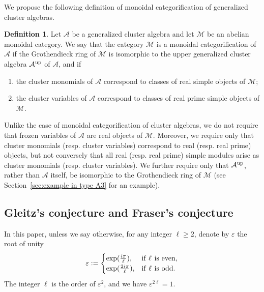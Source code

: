 \documentclass[11pt, reqno]{amsart}
\theoremstyle{plain}
\theoremstyle{definition}
\newtheorem{definition}[theorem]{Definition}
\numberwithin{equation}{section}
\begin{document}
We propose the following definition of monoidal categorification of generalized cluster algebras. 
\begin{definition}
Let $\mathcal{A}$ be a generalized cluster algebra and let $\mathcal{M}$ be an abelian monoidal category. We say that the category $\mathcal{M}$ is a monoidal categorification of $\mathcal{A}$ if the Grothendieck ring of $\mathcal{M}$ is isomorphic to the upper generalized cluster algebra $\mathcal{A}^{\rm up}$ of $\mathcal{A}$, and if 
\begin{enumerate}
\item the cluster monomials of $\mathcal{A}$ correspond to classes of real simple objects of $\mathcal{M}$;
\item the cluster variables of $\mathcal{A}$ correspond to classes of real prime simple objects of $\mathcal{M}$. 
\end{enumerate} 
\end{definition}

Unlike the case of monoidal categorification of cluster algebras, we do not require that frozen variables of $\mathcal{A}$ are real objects of $\mathcal{M}$. Moreover, we require only that cluster monomials (resp. cluster variables) correspond to real (resp. real prime) objects, but not conversely that all real (resp. real prime) simple modules arise as cluster monomials (resp. cluster variables). We further require only that $\mathcal{A}^{\rm up}$, rather than $\mathcal{A}$ itself, be isomorphic to the Grothendieck ring of $\mathcal{M}$ (see Section~\ref{sec:example in type A3} for an example). 

\subsection{Gleitz’s conjecture and Fraser's conjecture} \label{subsec:introduction:a proof of Gleitz conjecture}

In this paper, unless we say otherwise, for any integer $\ell\geq 2$, denote by $\varepsilon$ the root of unity
\begin{align*}
\varepsilon:=
\begin{cases} \text{exp}(\frac{i\pi}{\ell}), & \text{if}{\hskip 0.4em} \ell {\hskip 0.4em}\text{is even},\\
              \text{exp}(\frac{2i\pi}{\ell}), & \text{if}{\hskip 0.4em} \ell {\hskip 0.4em} \text{is odd}.
\end{cases}
\end{align*}
The integer $\ell$ is the order of $\varepsilon^{2}$, and we have $\varepsilon^{2 \ell}=1$.
\end{document}
